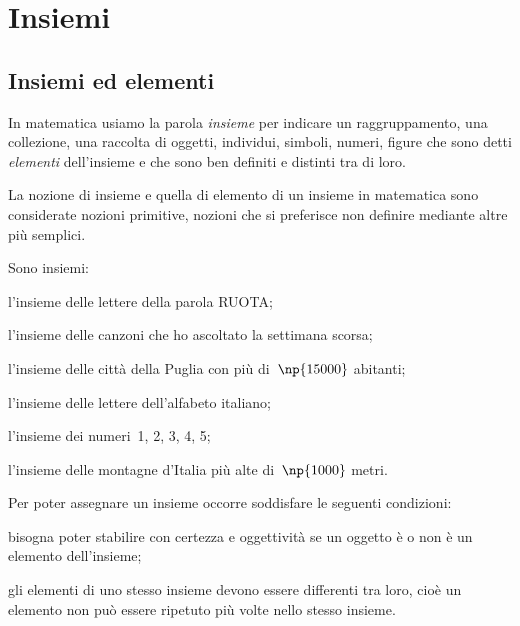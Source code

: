 \chapter{Insiemi}
\section{Insiemi ed elementi}

In matematica usiamo la parola \textit{insieme} per indicare un
raggruppamento, una collezione, una raccolta di oggetti, individui,
simboli, numeri, figure che sono detti \textit{elementi}
dell'insieme e che sono ben definiti e distinti tra di
loro.

La nozione di insieme e quella di elemento di un insieme in matematica
sono considerate nozioni primitive, nozioni che si preferisce non
definire mediante altre più semplici.

\begin{exrig}
 \begin{esempio}
 Sono insiemi:
 \begin{enumeratea}
  \item l'insieme delle lettere della parola RUOTA;
  \item l'insieme delle canzoni che ho ascoltato la settimana scorsa;
  \item l'insieme delle città della Puglia con più di~$\np{15000}$ abitanti;
  \item l'insieme delle lettere dell'alfabeto italiano;
  \item l'insieme dei numeri~1, 2, 3, 4, 5;
  \item l'insieme delle montagne d'Italia più alte di~$\np{1000}$ metri.
 \end{enumeratea}
 \end{esempio}
\end{exrig}

Per poter assegnare un insieme occorre soddisfare le seguenti condizioni:

\begin{itemize*}
\item bisogna poter stabilire con certezza e oggettività se un oggetto
è o non è un elemento dell'insieme;
\item gli elementi di uno stesso insieme devono essere differenti tra
loro, cioè un elemento non può essere ripetuto più volte nello stesso insieme.
\end{itemize*}

